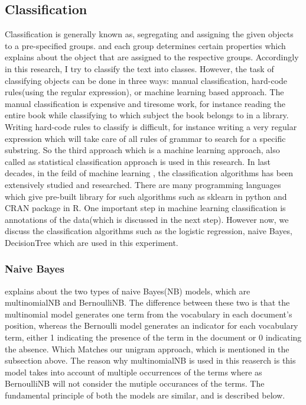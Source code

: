 \subsection{Classification}
Classification is generally known as, segregating and assigning the given objects to a pre-specified groups. and each group determines certain properties which explains about the object that are assigned to the respective groups. Accordingly in this research, I try to classify the text into classes. However, the task of classifying objects can be done in three ways:  manual classification, hard-code rules(using the regular expression), or machine learning based approach. The manual classification is expensive and tiresome work, for instance reading the entire book while classifying to which subject the book belongs to in a library. Writing hard-code rules to classify is difficult, for instance writing a very regular expression which will take care of all rules of grammar to search for a specific substring. So the third approach which is a machine learning approach, also called as statistical classification approach is used in this research. In last decades, in the feild of machine learning , the classification algorithms has been extensively studied and researched. There are many programming languages which give pre-built library for such algorithms such as sklearn \cite{scikit-learn} in python and  CRAN package in R. One important step in machine learning classification is annotations of the data(which is discussed in the next step). However now, we discuss the classification algorithms such as the logistic regression, naive Bayes, DecisionTree which are used in this experiment.

\subsubsection{Naive Bayes}

\cite{Manning:2008} explains about the two types of naive Bayes(NB) models, which are multinomialNB and BernoulliNB. The difference between these two is that the multinomial model generates one term from the vocabulary in each document's position, whereas the Bernoulli model generates an indicator for each vocabulary term, either 1 indicating the presence of the term in the document or 0 indicating the absence. Which Matches  our unigram approach, which is mentioned in the subsection above. The reason why multinomialNB is used in this reaserch is this model takes into account of multiple occurrences of the terms where as BernoulliNB will not consider the mutiple occurances of the terms. The fundamental principle of both the models are similar, and is described below.

